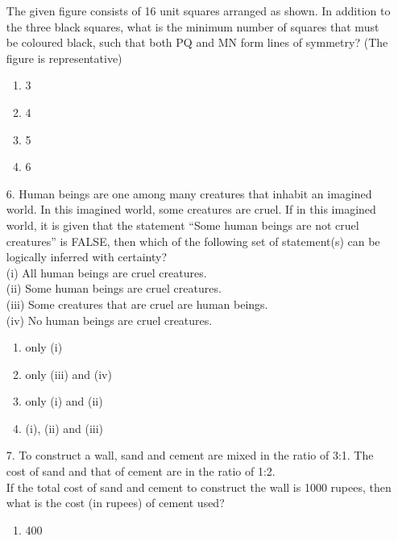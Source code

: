 \documentclass[journal]{IEEEtran}
\begin{document}
\begin{enumerate}
    The given figure consists of 16 unit squares arranged as shown. In addition to the
    three black squares, what is the minimum number of squares that must be coloured
    black, such that both PQ and MN form lines of symmetry? (The figure is
    representative)
    \begin{figure}[!ht]
        \centering
        \caption{}
    \end{figure}
    \begin{enumerate}[label = (\Alph*)]
        \item 3
        \item 4
        \item 5
        \item 6
    \end{enumerate}
    \item[6.]  Human beings are one among many creatures that inhabit an imagined world. In
    this imagined world, some creatures are cruel. If in this imagined world, it is given
    that the statement “Some human beings are not cruel creatures” is FALSE, then
    which of the following set of statement(s) can be logically inferred with certainty?\\
    (i) All human beings are cruel creatures.\\
    (ii) Some human beings are cruel creatures.\\
    (iii) Some creatures that are cruel are human beings.\\
    (iv) No human beings are cruel creatures.\\
    \begin{enumerate}[label = (\Alph*)]
        \item only (i)
        \item only (iii) and (iv)
        \item only (i) and (ii) 
        \item (i), (ii) and (iii)
    \end{enumerate}
    \item[7.] To construct a wall, sand and cement are mixed in the ratio of 3:1. The cost of sand
    and that of cement are in the ratio of 1:2. \\
    If the total cost of sand and cement to construct the wall is 1000 rupees, then what
    is the cost (in rupees) of cement used?
    \begin{enumerate}[label = (\Alph*)]
        \item 400

\end{enumerate}
\end{enumerate}
\end{document}

